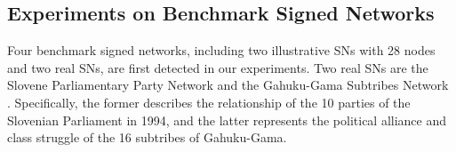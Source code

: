 \documentclass[10pt, journal]{IEEEtran}
\begin{document}
%
%


\subsection{Experiments on Benchmark Signed Networks} \label{section:Experiment and analysis:Benchmark}
Four benchmark signed networks, including two illustrative SNs \cite{yang2007community} with 28 nodes and two real SNs, are first detected in our experiments.
Two real SNs are the Slovene Parliamentary Party Network \cite{ferligoj1996analysis} and the Gahuku-Gama Subtribes Network  \cite{read1954cultures}. Specifically, the former describes the relationship of the 10 parties of the Slovenian Parliament in 1994, and the latter represents the political alliance and class struggle of the 16 subtribes of Gahuku-Gama.
\end{document}
